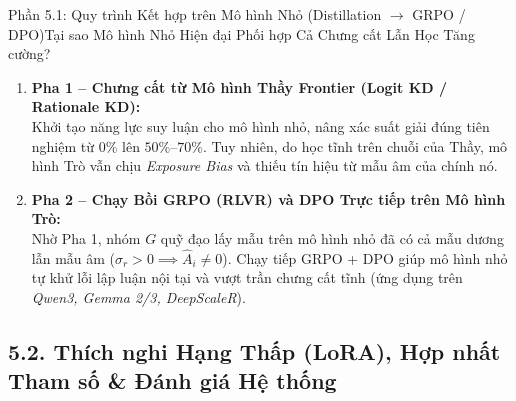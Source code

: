\begin{frame}{Phần 5.1: Quy trình Kết hợp trên Mô hình Nhỏ (Distillation $\longrightarrow$ GRPO / DPO)}{Tại sao Mô hình Nhỏ Hiện đại Phối hợp Cả Chưng cất Lẫn Học Tăng cường?}
  \small
  \begin{enumerate}\setlength{\itemsep}{7pt}
    \item \textbf{Pha 1 -- Chưng cất từ Mô hình Thầy Frontier (Logit KD / Rationale KD):}\\
      \footnotesize Khởi tạo năng lực suy luận cho mô hình nhỏ, nâng xác suất giải đúng tiên nghiệm từ $0\%$ lên $50\%\text{--}70\%$. Tuy nhiên, do học tĩnh trên chuỗi của Thầy, mô hình Trò vẫn chịu \textit{Exposure Bias} và thiếu tín hiệu từ mẫu âm của chính nó.
    \item \textbf{Pha 2 -- Chạy Bồi GRPO (RLVR) và DPO Trực tiếp trên Mô hình Trò:}\\
      \footnotesize Nhờ Pha 1, nhóm $G$ quỹ đạo lấy mẫu trên mô hình nhỏ đã có cả mẫu dương lẫn mẫu âm ($\sigma_r > 0 \implies \hat{A}_i \neq 0$). Chạy tiếp GRPO + DPO giúp mô hình nhỏ tự khử lỗi lập luận nội tại và vượt trần chưng cất tĩnh (ứng dụng trên \textit{Qwen3, Gemma 2/3, DeepScaleR}).
  \end{enumerate}
\end{frame}

\subsection{5.2. Thích nghi Hạng Thấp (LoRA), Hợp nhất Tham số \& Đánh giá Hệ thống}

